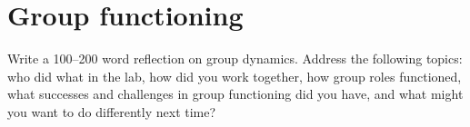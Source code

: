 \section{Group functioning}

\begin{steps}
	\item Write a 100--200 word reflection on group dynamics. Address the following topics: who did what in the lab, how did you work together, how group roles functioned, what successes and challenges in group functioning did you have, and what might you want to do differently next time?
\end{steps}

%	
%	
%	
%
%
%	

